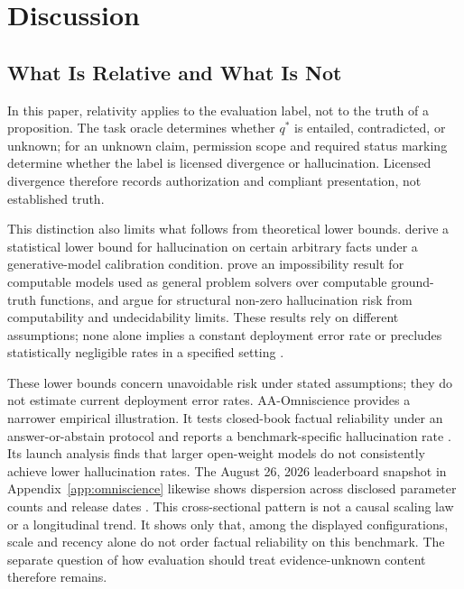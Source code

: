 \documentclass{clv2025}
\begin{document}
\section{Discussion}\label{sec:discussion}

\subsection{What Is Relative and What Is Not}\label{subsec:relative}

In this paper, relativity applies to the evaluation label, not to the truth of a
proposition. The task oracle determines whether $q^*$ is entailed,
contradicted, or unknown; for an unknown claim, permission scope and required
status marking determine whether the label is licensed divergence or
hallucination. Licensed divergence therefore records authorization and
compliant presentation, not established truth.

This distinction also limits what follows from theoretical lower bounds.
\citet{kalai_calibrated_2024} derive a statistical lower bound for
hallucination on certain arbitrary facts under a generative-model calibration
condition.
\citet{xu_hallucination_2024} prove an impossibility result for computable
models used as general problem solvers over computable ground-truth functions,
and \citet{banerjee_llms_2024} argue for structural non-zero hallucination risk
from computability and undecidability limits.
These results rely on different assumptions; none alone implies a constant
deployment error rate or precludes statistically negligible rates in a
specified setting \citep{suzuki_negligible_2025}.

These lower bounds concern unavoidable risk under stated assumptions; they do
not estimate current deployment error rates. AA-Omniscience provides a narrower
empirical illustration. It tests closed-book factual reliability under an
answer-or-abstain protocol and reports a benchmark-specific hallucination rate
\citep{jackson_aaomniscience_2025}. Its launch analysis finds that larger
open-weight models do not consistently achieve lower hallucination rates. The
August 26, 2026 leaderboard snapshot in Appendix~\ref{app:omniscience} likewise
shows dispersion across disclosed parameter counts and release dates
\citep{artificialanalysis_omniscience_leaderboard_2026}. This cross-sectional
pattern is not a causal scaling law or a longitudinal trend. It shows only that,
among the displayed configurations, scale and recency alone do not order
factual reliability on this benchmark. The separate question of how evaluation
should treat evidence-unknown content therefore remains.
\end{document}
